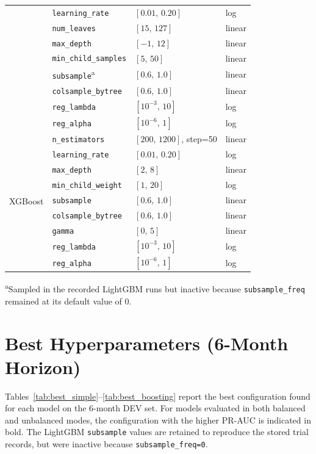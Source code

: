\begin{table}[htbp]
\begin{tabular}{l l l l}
  & \texttt{learning\_rate}    & $[0.01,\,0.20]$          & log \\
  & \texttt{num\_leaves}       & $[15,\,127]$             & linear \\
  & \texttt{max\_depth}        & $[-1,\,12]$              & linear \\
  & \texttt{min\_child\_samples} & $[5,\,50]$             & linear \\
  & \texttt{subsample}\textsuperscript{a} & $[0.6,\,1.0]$            & linear \\
  & \texttt{colsample\_bytree} & $[0.6,\,1.0]$            & linear \\
  & \texttt{reg\_lambda}       & $[10^{-3},\,10]$         & log \\
  & \texttt{reg\_alpha}        & $[10^{-6},\,1]$          & log \\
\midrule
\multirow{9}{*}{XGBoost}
  & \texttt{n\_estimators}     & $[200,\,1200]$, step=50  & linear \\
  & \texttt{learning\_rate}    & $[0.01,\,0.20]$          & log \\
  & \texttt{max\_depth}        & $[2,\,8]$                & linear \\
  & \texttt{min\_child\_weight}& $[1,\,20]$               & log \\
  & \texttt{subsample}         & $[0.6,\,1.0]$            & linear \\
  & \texttt{colsample\_bytree} & $[0.6,\,1.0]$            & linear \\
  & \texttt{gamma}             & $[0,\,5]$                & linear \\
  & \texttt{reg\_lambda}       & $[10^{-3},\,10]$         & log \\
  & \texttt{reg\_alpha}        & $[10^{-6},\,1]$          & log \\
\bottomrule
\end{tabular}
\par\smallskip
{\scriptsize \textsuperscript{a}Sampled in the recorded LightGBM runs but inactive because \texttt{subsample\_freq} remained at its default value of 0.}
\end{table}


\section{Best Hyperparameters (6-Month Horizon)}
\label{app:best_params}

Tables~\ref{tab:best_simple}--\ref{tab:best_boosting} report the best configuration found for each model on the 6-month DEV set.
For models evaluated in both balanced and unbalanced modes, the configuration with the higher PR-AUC is indicated in bold.
The LightGBM \texttt{subsample} values are retained to reproduce the stored trial records, but were inactive because \texttt{subsample\_freq=0}.

